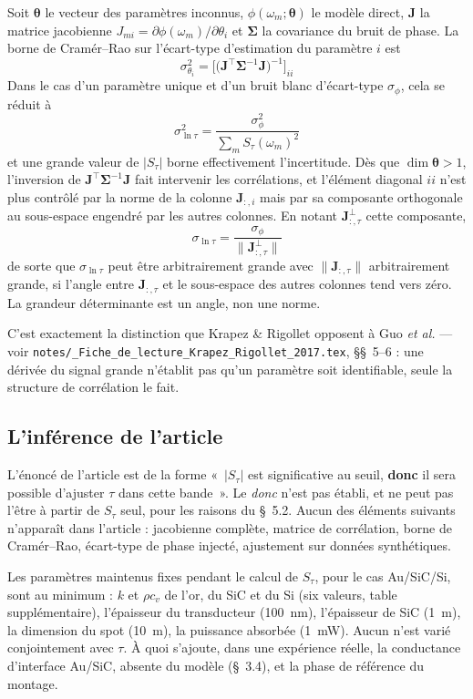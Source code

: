 \documentclass[11pt,a4paper]{article}
\newcommand{\code}[1]{\texttt{\small #1}}
\begin{document}
Soit $\boldsymbol\theta$ le vecteur des paramètres inconnus,
$\phi(\omega_m;\boldsymbol\theta)$ le modèle direct, $\mathbf J$ la matrice jacobienne
$J_{mi} = \partial\phi(\omega_m)/\partial\theta_i$ et $\boldsymbol\Sigma$ la covariance du bruit
de phase. La borne de Cramér--Rao sur l'écart-type d'estimation du paramètre $i$ est
\[
\sigma^2_{\theta_i}
= \Big[\big(\mathbf J^{\!\top}\boldsymbol\Sigma^{-1}\mathbf J\big)^{-1}\Big]_{ii}
\]
Dans le cas d'un paramètre unique et d'un bruit blanc d'écart-type $\sigma_\phi$, cela se réduit
à
\[
\sigma^2_{\ln\tau} = \frac{\sigma_\phi^2}{\sum_m S_\tau(\omega_m)^2}
\]
et une grande valeur de $|S_\tau|$ borne effectivement l'incertitude. Dès que
$\dim\boldsymbol\theta > 1$, l'inversion de
$\mathbf J^{\!\top}\boldsymbol\Sigma^{-1}\mathbf J$ fait intervenir les corrélations, et
l'élément diagonal $ii$ n'est plus contrôlé par la norme de la colonne $\mathbf J_{:,i}$ mais
par sa composante orthogonale au sous-espace engendré par les autres colonnes. En notant
$\mathbf J_{:,\tau}^{\perp}$ cette composante,
\[
\sigma_{\ln\tau} = \frac{\sigma_\phi}{\big\|\mathbf J_{:,\tau}^{\perp}\big\|}
\]
de sorte que $\sigma_{\ln\tau}$ peut être arbitrairement grande avec
$\|\mathbf J_{:,\tau}\|$ arbitrairement grande, si l'angle entre $\mathbf J_{:,\tau}$ et le
sous-espace des autres colonnes tend vers zéro. La grandeur déterminante est un angle, non une
norme.

C'est exactement la distinction que Krapez \& Rigollet opposent à Guo \textit{et al.} --- voir
\code{notes/\_Fiche\_de\_lecture\_Krapez\_Rigollet\_2017.tex}, §§~5--6 : une dérivée du signal grande n'établit pas qu'un paramètre
soit identifiable, seule la structure de corrélation le fait.

\subsection{L'inférence de l'article}

L'énoncé de l'article est de la forme «~$|S_\tau|$ est significative au seuil, \textbf{donc} il
sera possible d'ajuster $\tau$ dans cette bande~». Le \textit{donc} n'est pas établi, et ne peut
pas l'être à partir de $S_\tau$ seul, pour les raisons du §~5.2. Aucun des éléments suivants
n'apparaît dans l'article : jacobienne complète, matrice de corrélation, borne de
Cramér--Rao, écart-type de phase injecté, ajustement sur données synthétiques.

Les paramètres maintenus fixes pendant le calcul de $S_\tau$, pour le cas Au/SiC/Si, sont au
minimum : $k$ et $\rho c_v$ de l'or, du SiC et du Si (six valeurs, table supplémentaire),
l'épaisseur du transducteur (100~nm), l'épaisseur de SiC (1~\textmu m), la dimension du spot
(10~\textmu m), la puissance absorbée (1~mW). Aucun n'est varié conjointement avec $\tau$. À
quoi s'ajoute, dans une expérience réelle, la conductance d'interface Au/SiC, absente du modèle
(§~3.4), et la phase de référence du montage.
\end{document}
